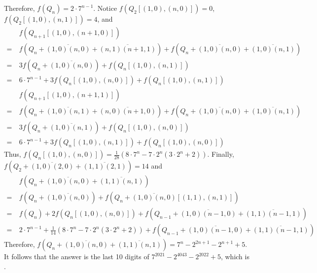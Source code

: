\begin{solution}
	Therefore, $f(Q_n) = 2\cdot 7^{n-1}$. Notice $f(Q_2[(1,0),(n,0)]) = 0$, $f(Q_2[(1,0),(n,1)]) = 4$, and
	\begin{align*}
	&\ f(Q_{n+1}[(1,0),(n+1,0)])\\
	=&\ f\left(Q_n+\overline{(1,0)(n,0)}+\overline{(n,1)(n+1,1)}\right) + f\left(Q_n+\overline{(1,0)(n,0)}+\overline{(1,0)(n,1)}\right)\\
	=&\ 3f\left(Q_n+\overline{(1,0)(n,0)}\right) + f(Q_n[(1,0),(n,1)])\\
	=&\ 6\cdot 7^{n-1} + 3f(Q_n[(1,0),(n,0)]) + f(Q_n[(1,0),(n,1)])
	\end{align*}
	\begin{align*}
	&\ f(Q_{n+1}[(1,0),(n+1,1)])\\
	=&\ f\left(Q_n+\overline{(1,0)(n,1)}+\overline{(n,0)(n+1,0)}\right) + f\left(Q_n+\overline{(1,0)(n,0)}+\overline{(1,0)(n,1)}\right)\\
	=&\ 3f\left(Q_n+\overline{(1,0)(n,1)}\right) + f(Q_n[(1,0),(n,0)])\\
	=&\ 6\cdot 7^{n-1} + 3f(Q_n[(1,0),(n,1)]) + f(Q_n[(1,0),(n,0)])
	\end{align*}
	Thus, $f(Q_n[(1,0),(n,0)]) = \frac{1}{28} (8\cdot 7^n - 7\cdot 2^n (3\cdot 2^n + 2))$.
	Finally, $f\left(Q_2+\overline{(1,0)(2,0)}+\overline{(1,1)(2,1)}\right) = 14$ and
	\begin{align*}
	&\ f\left(Q_n+\overline{(1,0)(n,0)}+\overline{(1,1)(n,1)}\right)\\
	=&\ f\left(Q_n+\overline{(1,0)(n,0)}\right) + f\left(Q_n+\overline{(1,0)(n,0)}[(1,1),(n,1)]\right)\\
	=&\ f(Q_n) + 2f(Q_n[(1,0),(n,0)]) + f\left(Q_{n-1}+\overline{(1,0)(n-1,0)}+\overline{(1,1)(n-1,1)}\right)\\
	=&\ 2\cdot 7^{n-1} + \frac{1}{14} (8\cdot 7^n - 7\cdot 2^n (3\cdot 2^n + 2)) + f\left(Q_{n-1}+\overline{(1,0)(n-1,0)}+\overline{(1,1)(n-1,1)}\right)
	\end{align*}
	Therefore, $f\left(Q_n+\overline{(1,0)(n,0)}+\overline{(1,1)(n,1)}\right) = 7^n - 2^{2n+1} - 2^{n+1} + 5$. 
	It follows that the answer is the last 10 digits of $7^2021 - 2^{4043} - 2^{2022} + 5$, which is .
\end{solution}\bigskip
